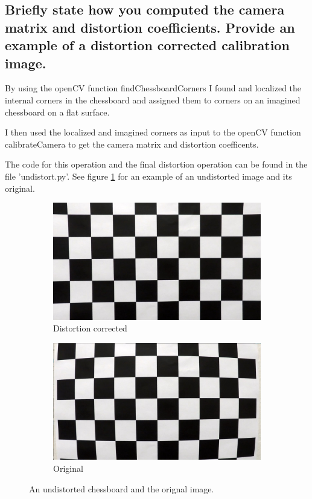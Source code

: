 \documentclass[12pt,a4paper]{article}
\begin{document}
\subsection{Briefly state how you computed the camera matrix and distortion coefficients. Provide an example of a distortion corrected calibration image.}

By using the openCV function findChessboardCorners I found and localized the internal corners in the chessboard and assigned them to corners on an imagined chessboard on a flat surface.

I then used the localized and imagined corners as input to the openCV function calibrateCamera to get the camera matrix and distortion coefficents.

The code for this operation and the final distortion operation can be found in the file 'undistort.py'. See figure \ref{distorted} for an example of an undistorted image and its original.

\begin{figure}
    \centering
    \begin{subfigure}[b]{0.45\textwidth}
        \includegraphics[width=\textwidth]{../output_images/undist-chessboard.jpg}
        \caption{Distortion corrected}
    \end{subfigure}
    \begin{subfigure}[b]{0.45\textwidth}
        \includegraphics[width=\textwidth]{../camera_cal/calibration1.jpg}
        \caption{Original}
    \end{subfigure}
    \caption{An undistorted chessboard and the orignal image.}
    \label{distorted}
\end{figure}
\end{document}
